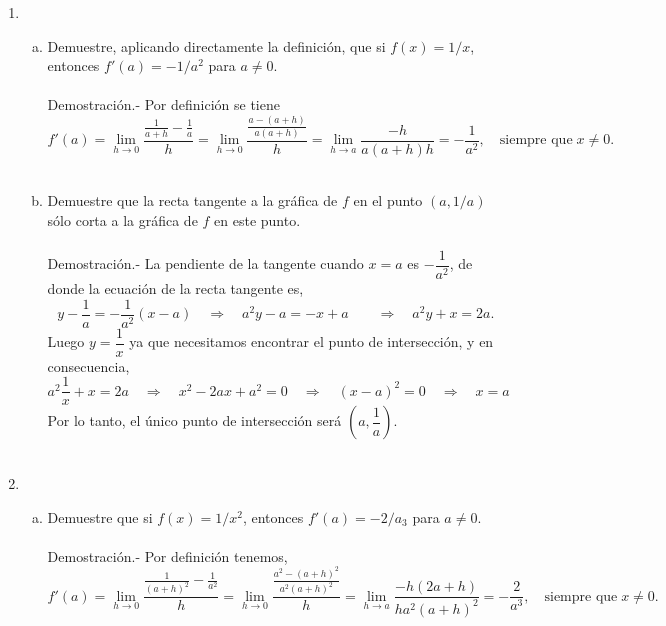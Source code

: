 \begin{enumerate}[\bfseries 1]

    \item 
	\begin{enumerate}[(a)]

	    \item Demuestre, aplicando directamente la definición, que si $f(x)=1/x$, entonces $f'(a)=-1/a^2$ para $a\neq 0$.\\\\
		Demostración.-\; Por definición se tiene $$f'(a)=\lim_{h\to 0}\dfrac{\frac{1}{a+h}-\frac{1}{a}}{h} = \lim_{h\to 0} \dfrac{\frac{a-(a+h)}{a(a+h)}}{h} = \lim_{h\to a}\dfrac{-h}{a(a+h)h} = -\dfrac{1}{a^2}, \quad \mbox{siempre que}\; x\neq 0.$$\\

	    \item Demuestre que la recta tangente a la gráfica de $f$ en el punto $(a,1/a)$ sólo corta a la gráfica de $f$ en este punto.\\\\
		Demostración.-\; La pendiente de la tangente cuando $x=a$ es $-\dfrac{1}{a^2}$, de donde la ecuación de la recta tangente es,
		$$y-\dfrac{1}{a} = -\dfrac{1}{a^2}(x-a)\quad \Rightarrow \quad a^2y-a=-x+a \qquad \Rightarrow \quad a^2y+x=2a.$$
		Luego $y=\dfrac{1}{x}$ ya que necesitamos encontrar el punto de intersección, y en consecuencia,
		$$a^2\dfrac{1}{x}+x=2a\quad \Rightarrow \quad x^2-2ax+a^2=0 \quad \Rightarrow \quad (x-a)^2=0 \quad \Rightarrow \quad x=a$$
		Por lo tanto, el único punto de intersección será $\left(a,\dfrac{1}{a}\right)$.\\\\

	\end{enumerate}

    \item
	\begin{enumerate}[(a)]

	    \item Demuestre que si $f(x)=1/x^2$, entonces $f'(a)=-2/a_3$ para $a\neq 0$.\\\\
		Demostración.-\; Por definición tenemos,
		$$f'(a)=\lim_{h\to 0}\dfrac{\frac{1}{(a+h)^2}-\frac{1}{a^2}}{h} = \lim_{h\to 0} \dfrac{\frac{a^2-(a+h)^2}{a^2(a+h)^2}}{h} = \lim_{h\to a}\dfrac{-h(2a+h)}{ha^2(a+h)^2} = -\dfrac{2}{a^3}, \quad \mbox{siempre que}\; x\neq 0.$$\\


\end{enumerate}
\end{enumerate}
